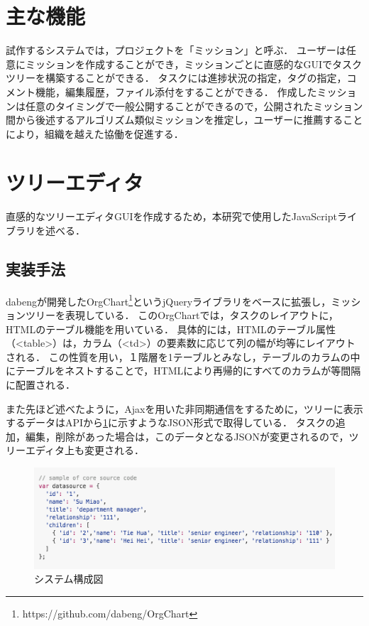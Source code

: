 \section{主な機能}
試作するシステムでは，プロジェクトを「ミッション」と呼ぶ．
ユーザーは任意にミッションを作成することができ，ミッションごとに直感的なGUIでタスクツリーを構築することができる．
タスクには進捗状況の指定，タグの指定，コメント機能，編集履歴，ファイル添付をすることができる．
作成したミッションは任意のタイミングで一般公開することができるので，公開されたミッション間から後述するアルゴリズム類似ミッションを推定し，ユーザーに推薦することにより，組織を越えた協働を促進する．

\section{ツリーエディタ}
直感的なツリーエディタGUIを作成するため，本研究で使用したJavaScriptライブラリを述べる．

\subsection{実装手法}
dabengが開発したOrgChart\footnote{https://github.com/dabeng/OrgChart}というjQueryライブラリをベースに拡張し，ミッションツリーを表現している．
このOrgChartでは，タスクのレイアウトに，HTMLのテーブル機能を用いている．
具体的には，HTMLのテーブル属性（<table>）は，カラム（<td>）の要素数に応じて列の幅が均等にレイアウトされる．
この性質を用い，１階層を1テーブルとみなし，テーブルのカラムの中にテーブルをネストすることで，HTMLにより再帰的にすべてのカラムが等間隔に配置される．

また先ほど述べたように，Ajaxを用いた非同期通信をするために，ツリーに表示するデータはAPIから\ref{img:json_sample}に示すようなJSON形式で取得している．
タスクの追加，編集，削除があった場合は，このデータとなるJSONが変更されるので，ツリーエディタ上も変更される．

\begin{figure}[t]
	\begin{center}
		\includegraphics[width=0.9\linewidth]{assets/img/json_sample.png}
		\caption{システム構成図}
		\label{img:json_sample}
	\end{center}
\end{figure}
